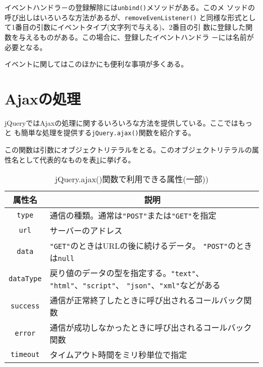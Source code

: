 イベントハンドラ－の登録解除には\texttt{unbind()}メソッドがある。このメ
ソッドの呼び出しはいろいろな方法があるが、\texttt{removeEvenListener()}
と同様な形式として1番目の引数にイベントタイプ(文字列で与える)、2番目の引
数に登録した関数を与えるものがある。この場合に、登録したイベントハンドラ
－には名前が必要となる。

イベントに関してはこのほかにも便利な事項が多くある。
\section{Ajaxの処理}
jQueryではAjaxの処理に関するいろいろな方法を提供している。ここではもっと
も簡単な処理を提供する\texttt{jQuery.ajax()}関数を紹介する。

この関数は引数にオブジェクトリテラルをとる。このオブジェクトリテラルの属
性名として代表的なものを表\ref{jQueryAjax}に挙げる。
\begin{table}[ht]
 \caption{jQuery.ajax()関数で利用できる属性(一部))}\label{jQueryAjax}
\begin{center}
 \begin{tabular}{|c|m{}|}\hline
属性名  &\multicolumn{1}{c|}{説明} \\\hline
  \texttt{type}&通信の種類。通常は\texttt{"POST"}または\texttt{"GET"}を指定\\
  \hline
  \texttt{url}&サーバーのアドレス\\ \hline
  \texttt{data}&\texttt{"GET"}のときはURLの後に続けるデータ。
      \texttt{"POST"}のときは\texttt{null}\\ \hline
  \texttt{dataType}&戻り値のデータの型を指定する。\texttt{"text"}、
      \texttt{"html"}、\texttt{"script"}、      
\texttt{"json"}、\texttt{"xml"}などがある\\ \hline
\texttt{success}&通信が正常終了したときに呼び出されるコールバック関数
      \\ \hline
\texttt{error}&通信が成功しなかったときに呼び出されるコールバック関数
      \\ \hline
  \texttt{timeout}&タイムアウト時間をミリ秒単位で指定\\ \hline
 \end{tabular}
\end{center}
\end{table}

